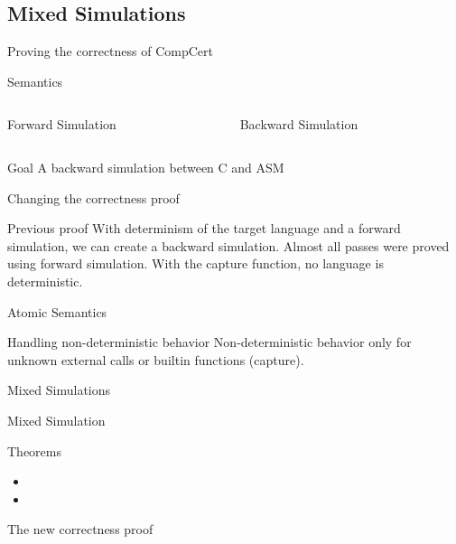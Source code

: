 \subsection{Mixed Simulations}
\begin{frame}{Proving the correctness of CompCert}
  \begin{block}{Semantics}
  \end{block}
  \vfill
  \begin{columns}[T] %
    \begin{column}{.48\textwidth}
      \begin{block}{Forward Simulation}
      \end{block}
    \end{column}%
    \hfill%
    \begin{column}{.48\textwidth}
      \begin{block}{Backward Simulation}
      \end{block}
    \end{column}%
  \end{columns}
  \vfill
  \begin{exampleblock}{Goal}
    A backward simulation between C and ASM
  \end{exampleblock}
\end{frame}

\begin{frame}{Changing the correctness proof}
  \begin{alertblock}{Previous proof}
    With determinism of the target language and a forward simulation, we can create a backward simulation.
    Almost all passes were proved using forward simulation.
    With the capture function, no language is deterministic.
  \end{alertblock}
  \vfill
  \begin{block}{Atomic Semantics}
  \end{block}
  \vfill
  \begin{exampleblock}{Handling non-deterministic behavior}
    Non-deterministic behavior only for unknown external calls or builtin functions (capture).
  \end{exampleblock}
\end{frame}

\begin{frame}{Mixed Simulations}
  \begin{block}{Mixed Simulation}
  \end{block}
  \vfill
  \begin{block}{Theorems}
    \begin{itemize}
    \item {}
    \item {}
    \end{itemize}
  \end{block}
\end{frame}

\begin{frame}{The new correctness proof}
\end{frame}
